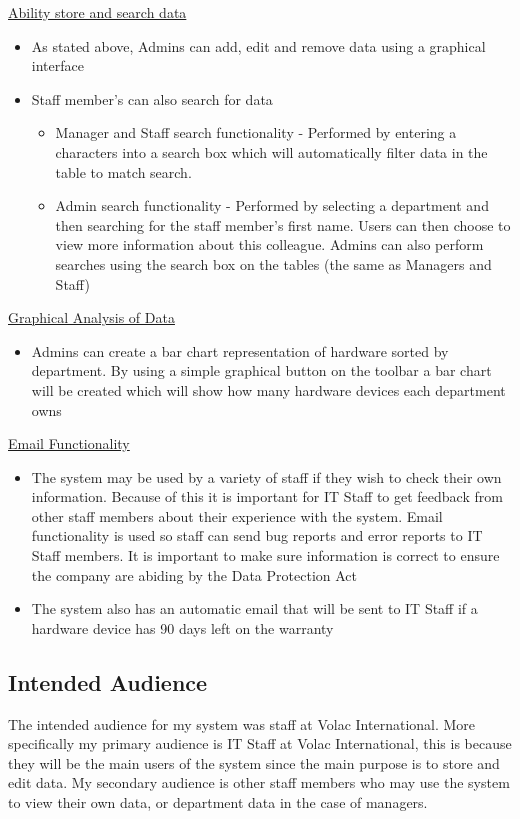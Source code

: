 \newpage
\underline{Ability store and search data}
\begin{itemize}
\item{As stated above, Admins can add, edit and remove data using a graphical interface}
\item{Staff member's can also search for data}
	\begin{itemize}
	\item Manager and Staff search functionality - Performed by entering a characters into a search box which will automatically filter data in the table to match search.
	\item{Admin search functionality - Performed by selecting a department and then searching for the staff member's first name. Users can then choose to view more information about this colleague. Admins can also perform searches using the search box on the tables (the same as Managers and Staff)}
	\end{itemize}
\end{itemize}

\underline{Graphical Analysis of Data}
\begin{itemize}
\item{Admins can create a bar chart representation of hardware sorted by department. By using a simple graphical button on the toolbar a bar chart will be created which will show how many hardware devices each department owns}
\end{itemize}

\underline{Email Functionality}
\begin{itemize}
\item{The system may be used by a variety of staff if they wish to check their own information. Because of this it is important for IT Staff to get feedback from other staff members about their experience with the system. Email functionality is used so staff can send bug reports and error reports to IT Staff members. It is important to make sure information is correct to ensure the company are abiding by the Data Protection Act}
\item{The system also has an automatic email that will be sent to IT Staff if a hardware device has 90 days left on the warranty}
\end{itemize}

\subsection{Intended Audience}

The intended audience for my system was staff at Volac International. More specifically my primary audience is IT Staff at Volac International, this is because they will be the main users of the system since the main purpose is to store and edit data. My secondary audience is other staff members who may use the system to view their own data, or department data in the case of managers.


